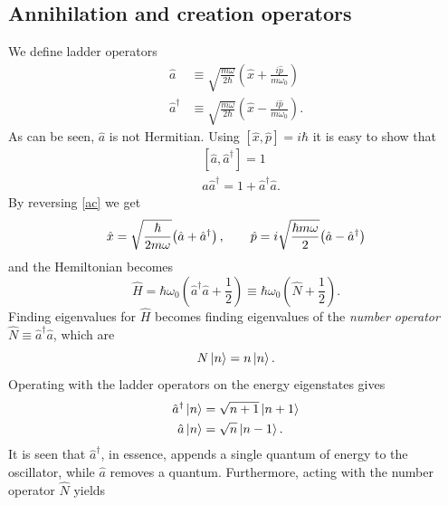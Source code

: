 \subsection{Annihilation and creation operators}
\label{sec:ladder-operators}
We define ladder operators
\begin{equation}
\begin{split}
\hat{a} &\equiv \sqrt{\frac{m\omega}{2\hbar}} \left(  \hat{x} + \frac{i\hat{p}}{m\omega_0}  \right) \\
\hat{a}^\dagger &\equiv \sqrt{\frac{m\omega}{2\hbar}}\left(  \hat{x} - \frac{i\hat{p}}{m\omega_0}  \right).
\end{split}\label{ac}
\end{equation}
As can be seen, $\hat{a}$ is not Hermitian. 
Using $\left[ \hat{x}, \hat{p}  \right] = i\hbar$ it is easy to show that
\begin{equation}\label{acom}
\begin{split}
&\left[ \hat{a}, \hat{a}^\dagger  \right] = 1\\
&\hat{a} \hat{a}^\dagger = 1 + \hat{a}^\dagger  \hat{a}.
\end{split}
\end{equation}
By reversing \ref{ac} we get
\begin{equation}\label{xho}
\hat{x} = \sqrt{\frac{\hbar}{2m\omega}}\qty(\hat{a} + \hat{a}^\dagger)\, ,\qquad
\hat{p} = i\sqrt{\frac{\hbar m \omega}{2}} \qty(\hat{a} - \hat{a}^\dagger)
\end{equation}
and the Hemiltonian becomes
\begin{equation}
\hat{H} = \hbar\omega_0\left(  \hat{a}^\dagger  \hat{a}+ \frac{1}{2} \right) \equiv \hbar\omega_0\left( \hat{N} + \frac{1}{2} \right).
\end{equation}
Finding eigenvalues for $\hat{H}$ becomes finding eigenvalues of the \emph{number operator} $\hat{N} \equiv  \hat{a}^\dagger  \hat{a}$, which are
\begin{equation}
N\ket{n}=n\ket{n}.
\end{equation}
Operating with the ladder operators on the energy eigenstates gives
\begin{equation}
\begin{split}
\hat{a}^\dagger \ket{n} &= \sqrt{n+1}\ket{n+1}\\
\hat{a}\ket{n} &= \sqrt{n}\ket{n-1}.
\end{split}
\end{equation}
It is seen that $\hat{a}^\dagger$, in essence, appends a single quantum of energy to the oscillator, while $\hat{a}$ removes a quantum. Furthermore, acting with the number operator $\hat{N}$ yields
